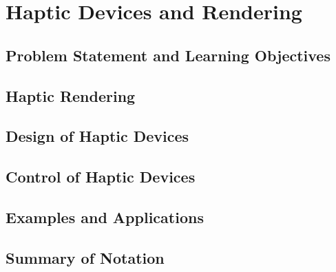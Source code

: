 %

\chapter{Haptic Devices and Rendering}

\section{Problem Statement and Learning Objectives}



\section{Haptic Rendering}
\section{Design of Haptic Devices}
\section{Control of Haptic Devices}
\section{Examples and Applications}

\section{Summary of Notation}


